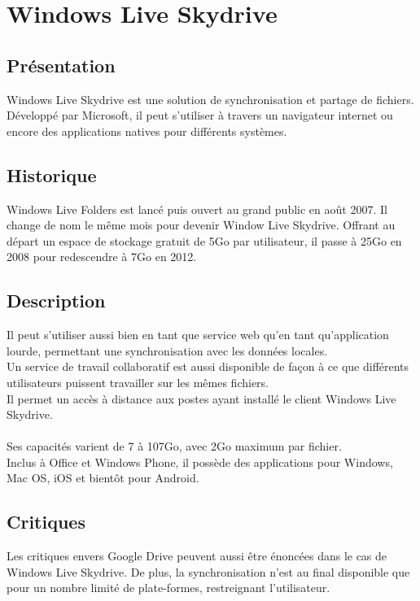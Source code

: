 \section{Windows Live Skydrive}
\thispagestyle{EIP} %

\subsection{Présentation}
Windows Live Skydrive est une solution de synchronisation et partage de fichiers. Développé par Microsoft, il peut s'utiliser à travers un navigateur internet ou encore des applications natives pour différents systèmes.

\subsection{Historique}
Windows Live Folders est lancé puis ouvert au grand public en août 2007. Il change de nom le même mois pour devenir Window Live Skydrive. Offrant au départ un espace de stockage gratuit de 5Go par utilisateur, il passe à 25Go en 2008 pour redescendre à 7Go en 2012.\\

\subsection{Description}
Il peut s'utiliser aussi bien en tant que service web qu'en tant qu'application lourde, permettant une synchronisation avec les données locales.\\
Un service de travail collaboratif est aussi disponible de façon à ce que différents utilisateurs puissent travailler sur les mêmes fichiers.\\
Il permet un accès à distance aux postes ayant installé le client Windows Live Skydrive.\\
\\
Ses capacités varient de 7 à 107Go, avec 2Go maximum par fichier.\\
Inclus à Office et Windows Phone, il possède des applications pour Windows, Mac OS, iOS et bientôt pour Android.\\

\subsection{Critiques}
Les critiques envers Google Drive peuvent aussi être énoncées dans le cas de Windows Live Skydrive. De plus, la synchronisation n'est au final disponible que pour un nombre limité de plate-formes, restreignant l'utilisateur.
